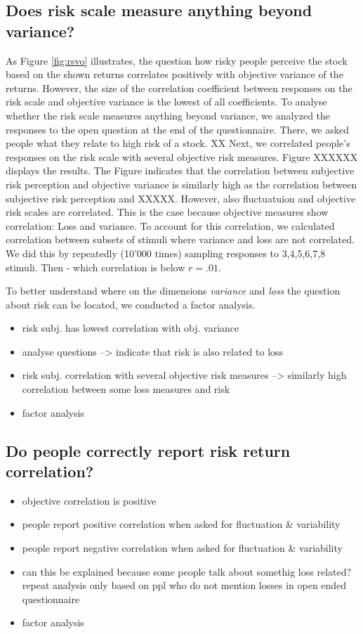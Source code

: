 \documentclass[a4paper,doc, natbib]{apa6} %
\begin{document}
\subsection{Does risk scale measure anything beyond variance?}
As Figure \ref{fig:rsvo} illustrates, the question how risky people perceive the stock based on the shown returns correlates positively with objective variance of the returns. However, the size of the correlation coefficient between responses on the risk scale and objective variance is the lowest of all coefficients. To analyse whether the risk scale measures anything beyond variance, we analyzed the responses to the open question at the end of the questionnaire. There, we asked people what they relate to high risk of a stock. XX
Next, we correlated people's responses on the risk scale with several objective risk measures. Figure XXXXXX displays the results. The Figure indicates that the correlation between subjective risk perception and objective variance is similarly high as the correlation between subjective risk perception and XXXXX. However, also fluctuatuion and objective risk scales are correlated. This is the case because objective measures show correlation: Loss and variance. To account for this correlation, we calculated correlation between subsets of stimuli where variance and loss are not correlated. We did this by repeatedly (10'000 times) sampling responses to 3,4,5,6,7,8 stimuli. Then - which correlation is below $r = .01$. 



To better understand where on the dimensions \textit{variance} and \textit{loss} the question about risk can be located, we conducted a factor analysis. 

\begin{itemize}
\item risk subj. has lowest correlation with obj. variance
\item analyse questions --> indicate that risk is also related to loss
\item risk subj. correlation with several objective risk measures --> similarly high correlation between some loss measures and risk
\item factor analysis
\end{itemize}


\subsection{Do people correctly report risk return correlation?}
\begin{itemize}
\item objective correlation is positive
\item people report positive correlation when asked for fluctuation & variability
\item people report negative correlation when asked for fluctuation & variability
\item can this be explained because some people talk about somethig loss related? repeat analysis only based on ppl who do not mention losses in open ended questionnaire
\item factor analysis

\end{itemize}
\end{document}
